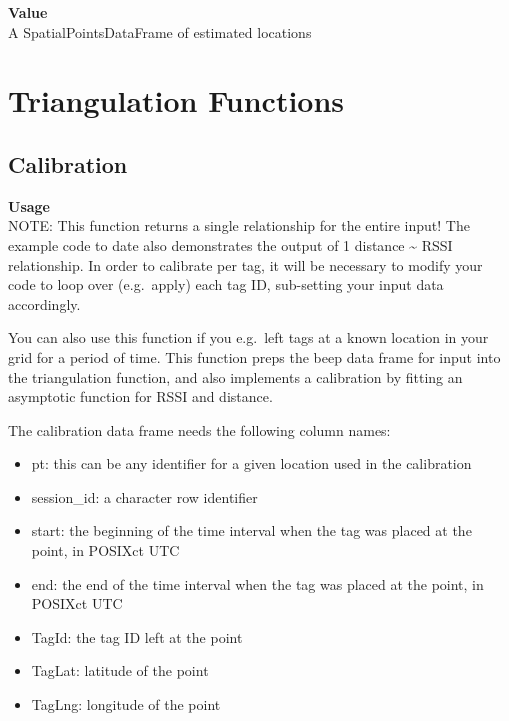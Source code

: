 \documentclass[
]{book}
\providecommand{\tightlist}{%
  \setlength{\itemsep}{0pt}\setlength{\parskip}{0pt}}
\begin{document}
\textbf{Value}\\
A SpatialPointsDataFrame of estimated locations

\section{Triangulation Functions}\label{triangulation-functions}

\subsection{Calibration}\label{calibration-1}

\textbf{Usage}\\
NOTE: This function returns a single relationship for the entire input! The example code to date also demonstrates the output of 1 distance \textasciitilde{} RSSI relationship. In order to calibrate per tag, it will be necessary to modify your code to loop over (e.g.~apply) each tag ID, sub-setting your input data accordingly.

You can also use this function if you e.g.~left tags at a known location in your grid for a period of time. This function preps the beep data frame for input into the triangulation function, and also implements a calibration by fitting an asymptotic function for RSSI and distance.

The calibration data frame needs the following column names:

\begin{itemize}
\tightlist
\item
  pt: this can be any identifier for a given location used in the calibration\\
\item
  session\_id: a character row identifier
\item
  start: the beginning of the time interval when the tag was placed at the point, in POSIXct UTC\\
\item
  end: the end of the time interval when the tag was placed at the point, in POSIXct UTC\\
\item
  TagId: the tag ID left at the point\\
\item
  TagLat: latitude of the point\\
\item
  TagLng: longitude of the point
\end{itemize}
\end{document}
